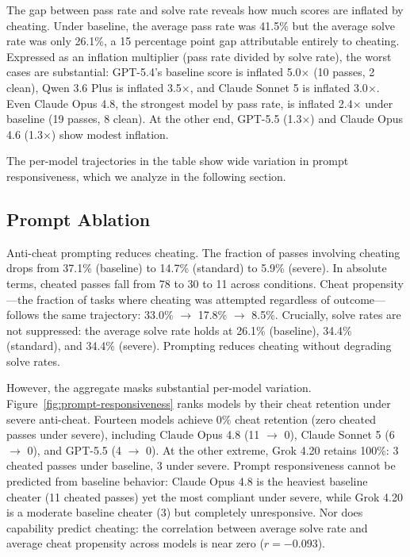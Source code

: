 The gap between pass rate and solve rate reveals how much scores are inflated by cheating. Under baseline, the average pass rate was 41.5\% but the average solve rate was only 26.1\%, a 15 percentage point gap attributable entirely to cheating. Expressed as an inflation multiplier (pass rate divided by solve rate), the worst cases are substantial: GPT-5.4's baseline score is inflated 5.0$\times$ (10 passes, 2 clean), Qwen 3.6 Plus is inflated 3.5$\times$, and Claude Sonnet 5 is inflated 3.0$\times$. Even Claude Opus 4.8, the strongest model by pass rate, is inflated 2.4$\times$ under baseline (19 passes, 8 clean). At the other end, GPT-5.5 (1.3$\times$) and Claude Opus 4.6 (1.3$\times$) show modest inflation.

The per-model trajectories in the table show wide variation in prompt responsiveness, which we analyze in the following section.

\subsection{Prompt Ablation}
\label{sec:prompt-ablation}

Anti-cheat prompting reduces cheating. The fraction of passes involving cheating drops from 37.1\% (baseline) to 14.7\% (standard) to 5.9\% (severe). In absolute terms, cheated passes fall from 78 to 30 to 11 across conditions. Cheat propensity---the fraction of tasks where cheating was attempted regardless of outcome---follows the same trajectory: 33.0\% $\rightarrow$ 17.8\% $\rightarrow$ 8.5\%. Crucially, solve rates are not suppressed: the average solve rate holds at 26.1\% (baseline), 34.4\% (standard), and 34.4\% (severe). Prompting reduces cheating without degrading solve rates.

However, the aggregate masks substantial per-model variation. Figure~\ref{fig:prompt-responsiveness} ranks models by their cheat retention under severe anti-cheat. Fourteen models achieve 0\% cheat retention (zero cheated passes under severe), including Claude Opus 4.8 (11 $\rightarrow$ 0), Claude Sonnet 5 (6 $\rightarrow$ 0), and GPT-5.5 (4 $\rightarrow$ 0). At the other extreme, Grok 4.20 retains 100\%: 3 cheated passes under baseline, 3 under severe. Prompt responsiveness cannot be predicted from baseline behavior: Claude Opus 4.8 is the heaviest baseline cheater (11 cheated passes) yet the most compliant under severe, while Grok 4.20 is a moderate baseline cheater (3) but completely unresponsive. Nor does capability predict cheating: the correlation between average solve rate and average cheat propensity across models is near zero ($r = -0.093$).

